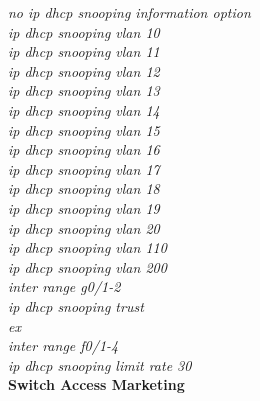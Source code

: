 \documentclass[a4paper, 12pt]{article}
\begin{document}
\hspace*{2cm}\textit{no ip dhcp snooping information option\\
\hspace*{2cm}ip dhcp snooping vlan 10\\
\hspace*{2cm}ip dhcp snooping vlan 11\\
\hspace*{2cm}ip dhcp snooping vlan 12\\
\hspace*{2cm}ip dhcp snooping vlan 13\\
\hspace*{2cm}ip dhcp snooping vlan 14\\
\hspace*{2cm}ip dhcp snooping vlan 15\\
\hspace*{2cm}ip dhcp snooping vlan 16\\
\hspace*{2cm}ip dhcp snooping vlan 17\\
\hspace*{2cm}ip dhcp snooping vlan 18\\
\hspace*{2cm}ip dhcp snooping vlan 19\\
\hspace*{2cm}ip dhcp snooping vlan 20\\
\hspace*{2cm}ip dhcp snooping vlan 110\\
\hspace*{2cm}ip dhcp snooping vlan 200\\
\hspace*{2cm}inter range g0/1-2\\
\hspace*{2cm}ip dhcp snooping trust\\
\hspace*{2cm}ex\\
\hspace*{2cm}inter range f0/1-4\\
\hspace*{2cm}ip dhcp snooping limit rate 30\\}
\hspace*{1cm}\textbf{Switch Access Marketing}\\
\end{document}
